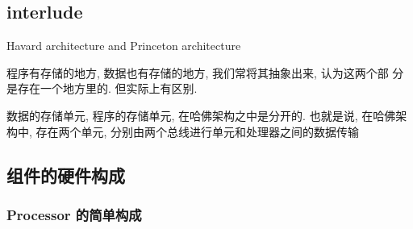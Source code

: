 \documentclass[11pt]{ctexart}
\begin{document}
\subsection{interlude}
\label{sec:orgc00afac}

Havard architecture and Princeton architecture

程序有存储的地方, 数据也有存储的地方, 我们常将其抽象出来, 认为这两个部
分是存在一个地方里的. 但实际上有区别. 

数据的存储单元, 程序的存储单元, 在哈佛架构之中是分开的. 
也就是说, 在哈佛架构中, 存在两个单元, 分别由两个总线进行单元和处理器之间的数据传输
\subsection{组件的硬件构成}
\label{sec:orgc54deba}
\subsubsection{Processor 的简单构成}
\label{sec:org28bf0e3}
\end{document}
